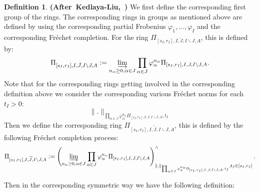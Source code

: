 \documentclass[12pt]{amsart}
\theoremstyle{definition}
\newtheorem{definition}[theorem]{Definition}
\numberwithin{equation}{section}
\begin{document}
\begin{definition}\mbox{\bf{(After Kedlaya-Liu, \cite[Definition 5.2.1]{KL2})}}
We first define the corresponding first group of the rings. The corresponding rings in groups as mentioned above are defined by using the corresponding partial Frobenius $\varphi_1,...,\varphi_I$ and the corresponding Fr\'echet completion.	For the ring $\Pi_{[s_I,r_I],I,\breve{J},I\backslash J,A}$, this is defined by:
\begin{align}
\Pi_{[s_I,r_I],I,\breve{J},I\backslash J,A}:=\varinjlim_{n_\alpha\geq 0,\alpha  \in J}\prod_{\alpha\in J}\varphi_\alpha^{n_\alpha}\Pi_{[s_I,r_I],I,{J},I\backslash J,A}.
\end{align}
Note that for the corresponding rings getting involved in the corresponding definition above we consider the corresponding various Fr\'echet norms for each $t_I>0$:
\begin{displaymath}
\|.\|_{\prod_{\alpha\in J}\varphi_\alpha^{n_\alpha}\Pi_{[s_I,r_I],I,{J},I\backslash J,A},t_I}	
\end{displaymath}
Then we define the corresponding ring $\Pi_{[s_I,r_I],I,\widetilde{J},I\backslash J,A}$, this is defined by the following Fr\'echet completion process:
\begin{align}
\Pi_{[s_I,r_I],I,\widetilde{J},I\backslash J,A}:=\left(\varinjlim_{n_\alpha\geq 0,\alpha  \in J}\prod_{\alpha\in J}\varphi_\alpha^{n_\alpha}\Pi_{[s_I,r_I],I,{J},I\backslash J,A}\right)^\wedge_{\|.\|_{\prod_{\alpha\in J}\varphi_\alpha^{n_\alpha}\Pi_{[s_I,r_I],I,{J},I\backslash J,A},t_I},t_I\in [s_I,r_I]}.
\end{align}

  
\end{definition}











\indent Then in the corresponding symmetric way we have the following definition:
\end{document}
